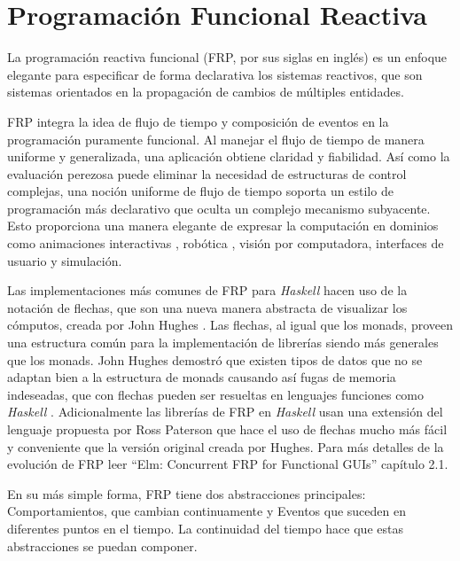 
\section{Programación Funcional Reactiva}  %

\ifpdf
    \graphicspath{{FRP/Figs/Raster/}{FRP/Figs/PDF/}{FRP/Figs/}}
\else
    \graphicspath{{FRP/Figs/Vector/}{FRP/Figs/}}
\fi

La programación reactiva funcional (FRP, por sus siglas en inglés) es un enfoque elegante para especificar de forma declarativa los sistemas reactivos, que son sistemas orientados en la propagación de cambios de múltiples entidades.

FRP integra la idea de flujo de tiempo y composición de eventos en la programación puramente funcional. Al manejar el flujo de tiempo de manera uniforme y generalizada, una aplicación obtiene claridad y fiabilidad. Así como la evaluación perezosa puede eliminar la necesidad de estructuras de control complejas, una noción uniforme de flujo de tiempo soporta un estilo de programación más declarativo que oculta un complejo mecanismo subyacente. Esto proporciona una manera elegante de expresar la computación en dominios como animaciones interactivas \cite{eh97:fran}, robótica \cite{Pembeci:2002:FRR:571157.571174}, visión por computadora, interfaces de usuario \cite{czaplicki2012elm} y simulación.

Las implementaciones más comunes de FRP para \emph{Haskell}  hacen uso de la notación de flechas, que son una nueva manera abstracta de visualizar los cómputos, creada por John Hughes \cite{hughes2000generalising}. Las flechas, al igual que los monads, proveen una estructura común para la implementación de librerías siendo más generales que los monads. John Hughes demostró que existen tipos de datos que no se adaptan bien a la estructura de monads causando así fugas de memoria indeseadas, que con flechas pueden ser resueltas en lenguajes funciones como \emph{Haskell} \cite{hughes2000generalising}. Adicionalmente las librerías de FRP en \emph{Haskell} usan una extensión del lenguaje propuesta por Ross  Paterson \cite{paterson2001new} que hace el uso de flechas mucho más fácil y conveniente que la versión original creada por Hughes. Para más detalles de la evolución de FRP leer ``Elm: Concurrent FRP for Functional GUIs'' \cite{czaplicki2012elm} capítulo 2.1.

En su más simple forma, FRP tiene dos abstracciones principales: Comportamientos, que cambian continuamente y Eventos que suceden en diferentes puntos en el tiempo. La continuidad del tiempo hace que estas abstracciones se puedan componer.

